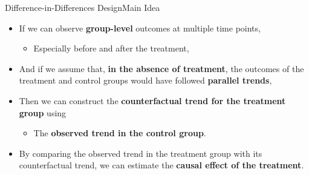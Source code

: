 \documentclass[dvipsnames,hyperref={pdfpagelabels=false}]{beamer}
\begin{document}
\begin{frame}{}
	\titlepage
\end{frame}




\begin{frame}{Difference-in-Differences Design}{Main Idea}
	\begin{itemize}
		
		\item If we can observe \textbf{group-level} outcomes at multiple time points,
		\vspace{0.2cm}
		\begin{itemize}
			\item Especially before and after the treatment,
		\end{itemize}
		\vspace{0.2cm}
		
		\item And if we assume that, \textbf{in the absence of treatment}, the outcomes of the treatment and control groups would have followed \textbf{parallel trends},
		\vspace{0.2cm}
		
		\item Then we can construct the \textbf{counterfactual trend for the treatment group} using
		\vspace{0.2cm}
		\begin{itemize}
			\item The \textbf{observed trend in the control group}.
		\end{itemize}
		\vspace{0.2cm}
		
		\item By comparing the observed trend in the treatment group with its counterfactual trend, we can estimate the \textbf{causal effect of the treatment}.
		
	\end{itemize}
\end{frame}
\end{document}

